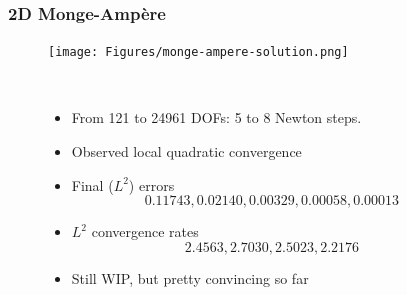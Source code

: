\documentclass[aspectratio=169,xcolor=dvipsnames,11pt]{beamer}
\begin{document}
\begin{frame}\frametitle{2D Monge-Amp\`ere}
\begin{figure}
	\centering
	\begin{minipage}{0.3\textwidth}
		\centering
		\texttt{[image: Figures/monge-ampere-solution.png]}
		\\
	\end{minipage}%
	\
	\begin{minipage}{0.6\textwidth}
	\begin{itemize}
	\item From 121 to 24961 DOFs:  5 to 8 Newton steps.
	\item Observed local quadratic convergence 
	\item Final ($L^2$) errors
	\[
	 0.11743, 0.02140, 0.00329, 0.00058, 0.00013
	\]
	\item $L^2$ convergence rates
	\[
	2.4563, 2.7030, 2.5023, 2.2176
	\]
	\item {\color{Red} Still WIP, but pretty convincing so far}
	\end{itemize}
	\end{minipage}%
	~~~

\end{figure}
\end{frame}
\end{document}
